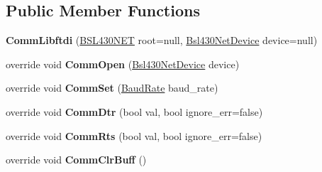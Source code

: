 \subsection*{Public Member Functions}
\begin{DoxyCompactItemize}
\item 
\mbox{\label{class_b_s_l430___n_e_t_1_1_comm_1_1_comm_libftdi_a145170f60b31681f511ef5cb0730425d}} 
{\bfseries Comm\+Libftdi} (\mbox{\hyperlink{class_b_s_l430___n_e_t_1_1_b_s_l430_n_e_t}{B\+S\+L430\+N\+ET}} root=null, \mbox{\hyperlink{class_b_s_l430___n_e_t_1_1_bsl430_net_device}{Bsl430\+Net\+Device}} device=null)
\item 
\mbox{\label{class_b_s_l430___n_e_t_1_1_comm_1_1_comm_libftdi_a830531600b4228d60c0d1309e71c93d1}} 
override void {\bfseries Comm\+Open} (\mbox{\hyperlink{class_b_s_l430___n_e_t_1_1_bsl430_net_device}{Bsl430\+Net\+Device}} device)
\item 
\mbox{\label{class_b_s_l430___n_e_t_1_1_comm_1_1_comm_libftdi_af5bbcf84e4701a8e469c028e1c170f2b}} 
override void {\bfseries Comm\+Set} (\mbox{\hyperlink{namespace_b_s_l430___n_e_t_a8d30c263598635a481840944d38aeb70}{Baud\+Rate}} baud\+\_\+rate)
\item 
\mbox{\label{class_b_s_l430___n_e_t_1_1_comm_1_1_comm_libftdi_a9c9a88559ff7b3c60cc56b15e2bd4663}} 
override void {\bfseries Comm\+Dtr} (bool val, bool ignore\+\_\+err=false)
\item 
\mbox{\label{class_b_s_l430___n_e_t_1_1_comm_1_1_comm_libftdi_a6ea78a78239528a9502fa7fa25ed2ec2}} 
override void {\bfseries Comm\+Rts} (bool val, bool ignore\+\_\+err=false)
\item 
\mbox{\label{class_b_s_l430___n_e_t_1_1_comm_1_1_comm_libftdi_a28b1bece8f37e84a2e1beebd68c62097}} 
override void {\bfseries Comm\+Clr\+Buff} ()
\item 
\mbox{\label{class_b_s_l430___n_e_t_1_1_comm_1_1_comm_libftdi_acd6d3483a6f1b9ba067390027c257cdd}} 

\end{DoxyCompactItemize}
